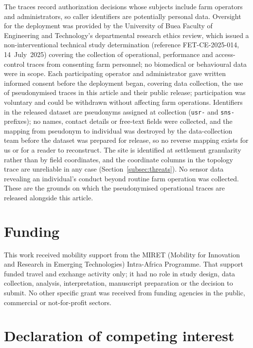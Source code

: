 \documentclass[a4paper,fleqn]{cas-dc}
\begin{document}
The traces record authorization decisions whose subjects include farm
operators and administrators, so caller identifiers are potentially personal
data. Oversight for the deployment was provided by the University of Buea
Faculty of Engineering and Technology's departmental research ethics review,
which issued a non-interventional technical study determination
(reference FET-CE-2025-014, 14~July~2025) covering the collection of
operational, performance and access-control traces from consenting farm
personnel; no biomedical or behavioural data were in scope. Each
participating operator and administrator gave written informed consent before
the deployment began,
covering data collection, the use of pseudonymised traces in this article and
their public release; participation was voluntary and could be withdrawn
without affecting farm operations. Identifiers in the released dataset are
pseudonyms assigned at collection (\texttt{usr-} and \texttt{sns-} prefixes);
no names, contact details or free-text fields were collected, and the
mapping from pseudonym to individual was destroyed by the data-collection
team before the dataset was prepared for release, so no reverse mapping
exists for us or for a reader to reconstruct. The site is identified at
settlement granularity rather than by field coordinates, and the coordinate
columns in the topology trace are unreliable in any case
(Section~\ref{subsec:threats}). No sensor data revealing an individual's
conduct beyond routine farm operation was collected. These are the grounds
on which the pseudonymised operational traces are released alongside this
article.

\section*{Funding}

This work received mobility support from the MIRET (Mobility for
Innovation and Research in Emerging Technologies) Intra-Africa Programme.
That support funded travel and exchange activity only; it had no role in
study design, data collection, analysis, interpretation, manuscript
preparation or the decision to submit. No other specific grant was
received from funding agencies in the public, commercial or
not-for-profit sectors.

\section*{Declaration of competing interest}
\end{document}
